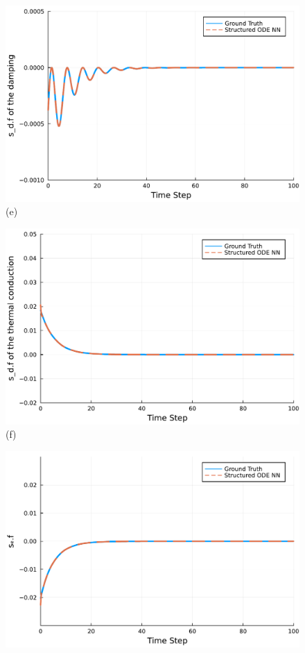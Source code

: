 \documentclass[
	parskip, 			   %
	twoside, 			   %
	DIV=14, 			   %
	BCOR=15.0mm, 		   %
	headsepline, 		   %
	open=right, 		   %
	captions=tableheading, %
	bibliography=totoc,    %
	numbers=noenddot       %
]{scrreprt}
\begin{document}
\begin{figure}[h!]
\begin{minipage}{.3\textwidth}
    \includegraphics[width=1\linewidth]{figures/sd_d.f_compositional_ndho_with_EPHS_structure_reuse.pdf}
    \\(e)
    \end{minipage}%
    \begin{minipage}{.3\textwidth}
    \centering
    \includegraphics[width=1\linewidth]{figures/sd_tc.f_compositional_ndho_with_EPHS_structure_reuse.pdf}
    \\(f)
    \end{minipage}
    \begin{minipage}{.3\textwidth}
    \centering
    \includegraphics[width=1\linewidth]{figures/se.f_compositional_ndho_with_EPHS_structure_reuse.pdf}

\end{minipage}
\end{figure}
\end{document}
